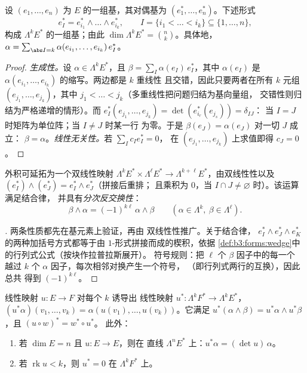 \begin{proposition}[$\Lambda^k$ 的基]\label{prop:b3:forms:basis}
设 $(e_1, \dots, e_n)$ 为 $E$ 的一组基，其对偶基为
$(e_1^*, \dots, e_n^*)$。下述形式
\[
e_I^* = e_{i_1}^* \wedge \dots \wedge e_{i_k}^*,
\qquad I = \{i_1 < \dots < i_k\} \subseteq \{1, \dots, n\},
\]
构成 $\Lambda^kE^*$ 的一组基；由此 $\dim\Lambda^kE^* =
\binom nk$。具体地，$\alpha =
\sum_{\abs I = k}\alpha(e_{i_1}, \dots, e_{i_k})\,e_I^*$。
\end{proposition}

\begin{proof}
\emph{生成性。}设 $\alpha \in \Lambda^kE^*$，且 $\beta =
\sum_I\alpha(e_I)\,e_I^*$，其中 $\alpha(e_I)$ 是
$\alpha(e_{i_1}, \dots, e_{i_k})$ 的缩写。两边都是 $k$ 重线性
且交错，因此只要两者在所有
$k$ 元组 $(e_{j_1}, \dots, e_{j_k})$，其中 $j_1 < \dots <
j_k$（多重线性把问题归结为基向量组，
交错性则归结为严格递增的情形）。而 $e_I^*(e_{j_1},
\dots, e_{j_k}) = \det(e_{i_r}^*(e_{j_s})) = \delta_{IJ}$：
当 $I = J$ 时矩阵为单位阵；当 $I \neq J$ 时某一行
为零。于是 $\beta(e_J) = \alpha(e_J)$ 对一切 $J$ 成立：
$\beta = \alpha$。\emph{线性无关性。}若 $\sum_I c_Ie_I^* = 0$，
在 $(e_{j_1}, \dots, e_{j_k})$ 上求值即得 $c_J = 0$。
\end{proof}

\begin{definition}\label{def:b3:forms:wedgegeneral}
外积可延拓为一个双线性映射
$\Lambda^kE^* \times \Lambda^\ell E^* \to
\Lambda^{k+\ell}E^*$，由双线性性以及
$(e_I^*) \wedge (e_J^*) = e_I^* \wedge e_J^*$（拼接后重排；
且乘积为 $0$，当 $I \cap J \neq
\varnothing$ 时）。该运算满足结合律，
并具有\emph{分次反交换性}：
\[
\beta \wedge \alpha = (-1)^{k\ell}\,\alpha \wedge \beta
\qquad (\alpha \in \Lambda^k, \ \beta \in \Lambda^\ell).
\]
\end{definition}

\begin{proof}[\omnameProof]
两条性质都先在基元素上验证，再由
双线性性推广。关于结合律，
$e_I^* \wedge e_J^* \wedge e_K^*$ 的两种加括号方式都等于由
$1$-形式拼接而成的楔积，依据
\cref{def:b3:forms:wedge}中的行列式公式（按块作拉普拉斯展开）。
符号规则：把 $\ell$ 个 $\beta$ 因子中的每一个
越过 $k$ 个 $\alpha$ 因子，每次相邻对换产生一个符号，
（即行列式两行的互换），因此总共
得到 $(-1)^{k\ell}$。
\end{proof}

\begin{proposition}[拉回，线性情形]
\label{prop:b3:forms:linearpullback}
线性映射 $u\colon E \to F$ 对每个 $k$ 诱导出
线性映射 $u^*\colon \Lambda^kF^* \to \Lambda^kE^*$，
$(u^*\alpha)(v_1, \dots, v_k) = \alpha(u(v_1), \dots,
u(v_k))$。它满足 $u^*(\alpha \wedge \beta) = u^*\alpha
\wedge u^*\beta$，且 $(u \circ w)^* = w^* \circ u^*$。
此外：
\begin{enumerate}
  \item 若 $\dim E = n$ 且 $u\colon E \to E$，则在
        直线 $\Lambda^nE^*$ 上：$u^*\alpha = (\det u)\,\alpha$。
  \item 若 $\operatorname{rk}u < k$，则 $u^* = 0$ 在
        $\Lambda^kF^*$ 上。
\end{enumerate}
\end{proposition}

